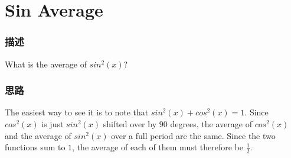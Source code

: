 \section{Sin Average}
\subsubsection{描述}
What is the average of $sin^2(x)$?
\subsubsection{思路}
The easiest way to see it is to note that $sin^2(x)+cos^2(x)=1$. Since $cos^2(x)$ is just $sin^2(x)$ shifted over by $90$ degrees, the average of $cos^2(x)$ and the average of 
$sin^2(x)$ over a full period are the same. Since the two functions sum to $1$, the average of each of them must therefore be $\frac{1}{2}$.